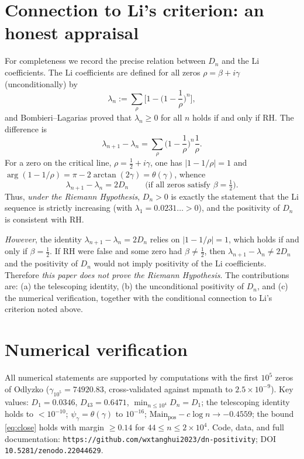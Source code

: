 \documentclass[11pt]{article}
\begin{document}
\section{Connection to Li's criterion: an honest appraisal}
\label{sec:conclusion}

For completeness we record the precise relation between $D_n$ and the Li
coefficients. The Li coefficients are defined for all zeros $\rho=\beta+i\gamma$
(unconditionally) by
\begin{equation*}
\lambda_n:=\sum_\rho\Big[1-\Big(1-\frac1\rho\Big)^n\Big],
\end{equation*}
and Bombieri--Lagarias \cite{BL1999} proved that $\lambda_n\ge0$ for all $n$
holds if and only if RH. The difference is
\begin{equation*}
\lambda_{n+1}-\lambda_n=\sum_\rho\Big(1-\frac1\rho\Big)^n\frac1\rho.
\end{equation*}
For a zero on the critical line, $\rho=\tfrac12+i\gamma$, one has
$|1-1/\rho|=1$ and $\arg(1-1/\rho)=\pi-2\arctan(2\gamma)=\theta(\gamma)$, whence
\begin{equation*}
\lambda_{n+1}-\lambda_n=2D_n\qquad\text{(if all zeros satisfy }\beta=\tfrac12\text{)}.
\end{equation*}
Thus, \emph{under the Riemann Hypothesis}, $D_n>0$ is exactly the statement that
the Li sequence is strictly increasing (with $\lambda_1=0.0231\ldots>0$), and the
positivity of $D_n$ is consistent with RH.

\emph{However}, the identity $\lambda_{n+1}-\lambda_n=2D_n$ relies on
$|1-1/\rho|=1$, which holds if and only if $\beta=\tfrac12$. If RH were false and
some zero had $\beta\ne\tfrac12$, then $\lambda_{n+1}-\lambda_n\ne2D_n$ and the
positivity of $D_n$ would not imply positivity of the Li coefficients. Therefore
\emph{this paper does not prove the Riemann Hypothesis}. The contributions are:
(a) the telescoping identity, (b) the unconditional positivity of $D_n$, and (c) the
numerical verification, together with the conditional connection to Li's criterion
noted above.

\section*{Numerical verification}
\label{sec:numerics}

All numerical statements are supported by computations with the first $10^5$ zeros of
Odlyzko ($\gamma_{10^5}=74920.83$, cross-validated against mpmath to $2.5\times10^{-9}$).
Key values: $D_1=0.0346$, $D_{43}=0.6471$, $\min_{n\le10^4}D_n=D_1$; the telescoping
identity holds to $<10^{-10}$; $\psi_\gamma=\theta(\gamma)$ to $10^{-16}$;
$\mathrm{Main}_{\mathrm{pos}}-c\log n\to-0.4559$; the bound \eqref{eq:close} holds with
margin $\ge0.14$ for $44\le n\le2\times10^4$. Code, data, and full documentation:
\texttt{https://github.com/wxtanghui2023/dn-positivity};
DOI \texttt{10.5281/zenodo.22044629}.
\end{document}
